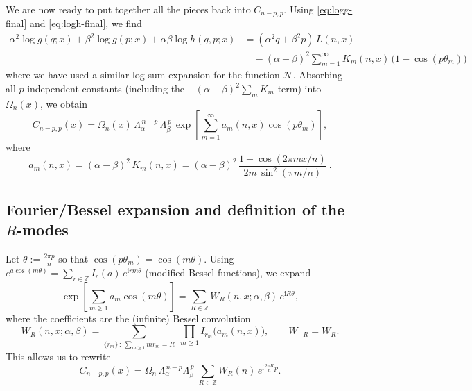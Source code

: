 \documentclass[11pt]{article}
\newcommand{\ii}{\mathrm{i}}
\begin{document}
{  We are now ready to put together all the pieces back into $C_{n-p,p}$. Using
  \eqref{eq:logg-final} and \eqref{eq:logh-final}, we find
  \begin{align}
    \alpha^{2}\log g(q;x)+\beta^{2}\log g(p;x)+\alpha\beta\log h(q,p;x) & =(\alpha^{2}q+\beta^{2}p)\,L(n,x) \nonumber                                                             \\
                                                                        & \quad-(\alpha-\beta)^{2}\sum_{m=1}^{\infty}K_{m}(n,x)\,\bigl(1-\cos(p\theta_{m})\bigr) \label{eq:combo}
  \end{align}
  where we have used a similar log-sum expansion for the function $\mathcal{N}$.
  Absorbing all $p$-independent constants (including the $-(\alpha-\beta)^{2}\sum
  _{m}K_{m}$ term) into $\Omega_{n}(x)$, we obtain
  \begin{equation}
    C_{n-p,p}(x) =\Omega_{n}(x)\,\Lambda_{\alpha}^{\,n-p}\,\Lambda_{\beta}^{\,p}\,
    \exp\!\left[\sum_{m=1}^{\infty}a_{m}(n,x)\cos(p\theta_{m})\right], \label{eq:C-expcos}
  \end{equation}
  where
  \begin{equation}
    a_{m}(n,x)=(\alpha-\beta)^{2}\,K_{m}(n,x) =(\alpha-\beta)^{2}\,\frac{1-\cos(2\pi
    m x/n)}{2m\,\sin^{2}(\pi m/n)}\ . \label{eq:am}
  \end{equation}

  \subsection{Fourier/Bessel expansion and definition of the $R$-modes}
  Let $\theta:=\frac{2\pi p}{n}$ so that $\cos(p\theta_{m})=\cos(m\theta)$. Using
  $e^{a\cos(m\theta)}=\sum_{r\in\mathbb{Z}}I_{r}(a)\,e^{\ii r m\theta}$ (modified
  Bessel functions), we expand
  \begin{equation}
    \exp\!\left[\sum_{m\ge 1}a_{m}\cos(m\theta)\right] =\sum_{R\in\mathbb{Z}}W_{R}
    (n,x;\alpha,\beta)\,e^{\ii R\theta}, \label{eq:WR-Fourier}
  \end{equation}
  where the coefficients are the (infinite) Bessel convolution
  \begin{equation}
    W_{R}(n,x;\alpha,\beta)= \sum_{\{r_m\}\,:\,\sum_{m\ge1} m r_m=R}\;\prod_{m\ge1}
    I_{r_m}\!\big(a_{m}(n,x)\big), \qquad W_{-R}=W_{R}. \label{eq:WR-def}
  \end{equation}
  This allows us to rewrite
  \begin{equation}
    C_{n-p,p}(x) =\Omega_{n}\,\Lambda_{\alpha}^{\,n-p}\Lambda_{\beta}^{\,p}\; \sum
    _{R\in\mathbb{Z}}W_{R}(n)\,e^{\ii \frac{2\pi R}{n}p}. \label{eq:C-R}
  \end{equation}

}
\end{document}
